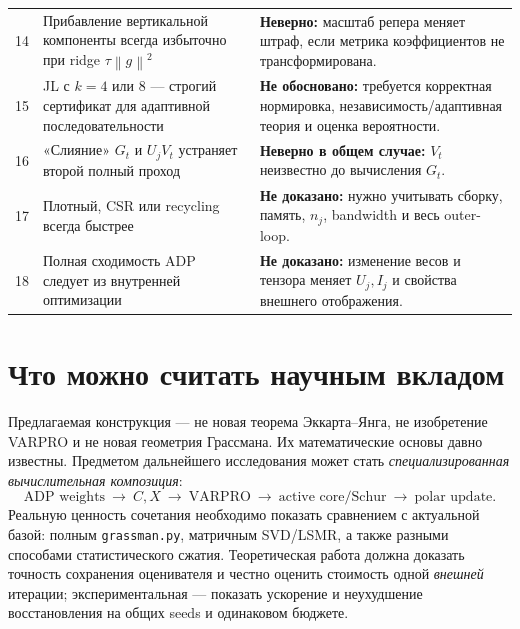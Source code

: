 \documentclass[10.5pt,a4paper]{article}
\newcommand{\norm}[1]{\left\|#1\right\|}
\numberwithin{equation}{section}
\theoremstyle{plain}
\theoremstyle{definition}
\begin{document}
\begin{longtable}{@{}P{8mm}P{58mm}P{76mm}@{}}
14 & Прибавление вертикальной компоненты всегда избыточно при ridge $\tau\norm g^2$ & \textbf{Неверно:} масштаб репера меняет штраф, если метрика коэффициентов не трансформирована.\\
15 & JL с $k=4$ или $8$ --- строгий сертификат для адаптивной последовательности & \textbf{Не обосновано:} требуется корректная нормировка, независимость/адаптивная теория и оценка вероятности.\\
16 & «Слияние» $G_t$ и $U_jV_t$ устраняет второй полный проход & \textbf{Неверно в общем случае:} $V_t$ неизвестно до вычисления $G_t$.\\
17 & Плотный, CSR или recycling всегда быстрее & \textbf{Не доказано:} нужно учитывать сборку, память, $n_j$, bandwidth и весь outer-loop.\\
18 & Полная сходимость ADP следует из внутренней оптимизации & \textbf{Не доказано:} изменение весов и тензора меняет $U_j,I_j$ и свойства внешнего отображения.\\
\bottomrule
\end{longtable}
\normalsize

\section{Что можно считать научным вкладом}
Предлагаемая конструкция --- не новая теорема Эккарта--Янга, не изобретение VARPRO и не новая геометрия Грассмана. Их математические основы давно известны. Предметом дальнейшего исследования может стать \emph{специализированная вычислительная композиция}:
\begin{equation}
 \text{ADP weights}\ \longrightarrow\ C,X\ \longrightarrow\
 \text{VARPRO}\ \longrightarrow\ \text{active core/Schur}\
 \longrightarrow\ \text{polar update}.
 \label{eq:pipeline}
\end{equation}
Реальную ценность сочетания необходимо показать сравнением с актуальной базой: полным \texttt{grassman.py}, матричным SVD/LSMR, а также разными способами статистического сжатия. Теоретическая работа должна доказать точность сохранения оценивателя и честно оценить стоимость одной \emph{внешней} итерации; экспериментальная --- показать ускорение и неухудшение восстановления на общих seeds и одинаковом бюджете.
\end{document}
